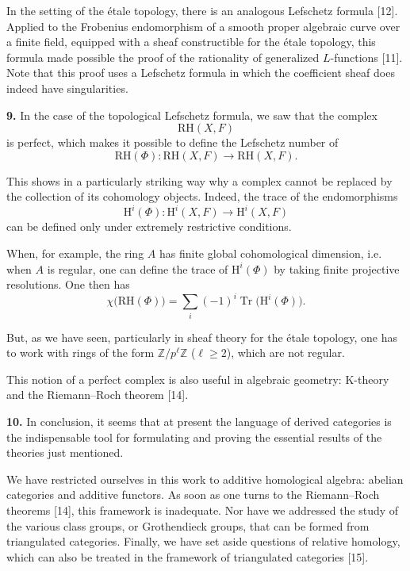 %
In the setting of the étale topology, there is an analogous Lefschetz formula
[12].
Applied to the Frobenius endomorphism of a smooth proper algebraic curve over
a finite field, equipped with a sheaf constructible for the étale topology,
this formula made possible the proof of the rationality of generalized
$L$-functions [11]. Note that this proof uses a Lefschetz formula in which
the coefficient sheaf does indeed have singularities.

\noindent\textbf{9.}\quad
In the case of the topological Lefschetz formula, we saw that the complex
\[
\mathrm{RH}(X,F)
\]
is perfect, which makes it possible to define the Lefschetz number of
\[
\mathrm{RH}(\Phi)\colon
\mathrm{RH}(X,F)\longrightarrow\mathrm{RH}(X,F).
\]

This shows in a particularly striking way why a complex cannot be replaced
by the collection of its cohomology objects. Indeed, the trace of the
endomorphisms
\[
\mathrm{H}^i(\Phi)\colon
\mathrm{H}^i(X,F)\longrightarrow\mathrm{H}^i(X,F)
\]
can be defined only under extremely restrictive conditions.

When, for example, the ring $A$ has finite global cohomological dimension,
i.e. when $A$ is regular, one can define the trace of $\mathrm{H}^i(\Phi)$
by taking finite projective resolutions. One then has
\[
\chi\bigl(\mathrm{RH}(\Phi)\bigr)
=\sum_i(-1)^i\operatorname{Tr}\bigl(\mathrm{H}^i(\Phi)\bigr).
\]

But, as we have seen, particularly in sheaf theory for the étale topology,
one has to work with rings of the form
$\mathbb{Z}/p^\ell\mathbb{Z}$ ($\ell\geq 2$), which are not regular.

This notion of a perfect complex is also useful in algebraic geometry:
K-theory and the Riemann--Roch theorem [14].

\noindent\textbf{10.}\quad
In conclusion, it seems that at present the language of derived categories
is the indispensable tool for formulating and proving the essential results
of the theories just mentioned.

We have restricted ourselves in this work to additive homological algebra:
abelian categories and additive functors. As soon as one turns to the
Riemann--Roch theorems [14], this framework is inadequate.
Nor have we addressed the study of the various class groups, or Grothendieck
groups, that can be formed from triangulated categories. Finally, we have
set aside questions of relative homology, which can also be treated in the
framework of triangulated categories [15].

